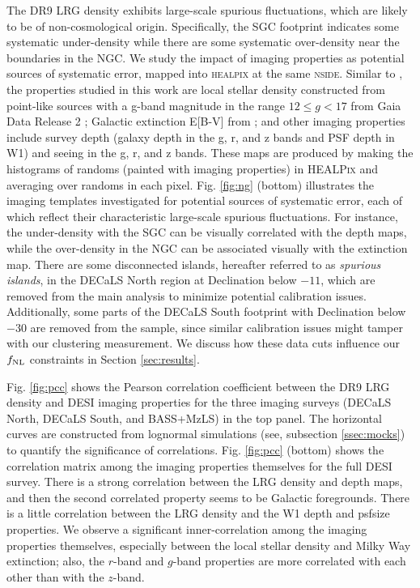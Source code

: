 The DR9 LRG density exhibits large-scale spurious fluctuations, which are likely to be of non-cosmological origin. Specifically, the SGC footprint indicates some systematic under-density while there are some systematic over-density near the boundaries in the NGC. We study the impact of imaging properties as potential sources of systematic error, mapped into \textsc{healpix} at the same \textsc{nside}. Similar to \cite{zhou2022target}, the properties studied in this work are local stellar density constructed from point-like sources with a g-band magnitude in the range $12 \leq g < 17$ from Gaia Data Release 2 \citep[see,][]{gaiadr2, myers2022};  Galactic extinction E[B-V] from \cite{schlegel1998maps}; and other imaging properties include survey depth (galaxy depth in the g, r, and z bands and PSF depth in W1) and seeing in the g, r, and z bands. These maps are produced by making the histograms of randoms (painted with imaging properties) in \textsc{HEALPix} and averaging over randoms in each pixel. Fig. \ref{fig:ng} (bottom) illustrates the imaging templates investigated for potential sources of systematic error, each of which reflect their characteristic large-scale spurious fluctuations. For instance, the under-density with the SGC can be visually correlated with the depth maps, while the over-density in the NGC can be associated visually with the extinction map. There are some disconnected islands, hereafter referred to as \textit{spurious islands}, in the DECaLS North region at Declination below $-11$, which are removed from the main analysis to minimize potential calibration issues. Additionally, some parts of the DECaLS South footprint with Declination below $-30$ are removed from the sample, since similar calibration issues might tamper with our clustering measurement. We discuss how these data cuts influence our $f_{\rm NL}$ constraints in Section \ref{sec:results}. 

Fig. \ref{fig:pcc} shows the Pearson correlation coefficient between the DR9 LRG density and DESI imaging properties for the three imaging surveys (DECaLS North, DECaLS South, and BASS+MzLS) in the top panel. The horizontal curves are constructed from lognormal simulations (see, subsection \ref{ssec:mocks}) to quantify the significance of correlations. Fig. \ref{fig:pcc} (bottom) shows the correlation matrix among the imaging properties themselves for the full DESI survey. There is a strong correlation between the LRG density and depth maps, and then the second correlated property seems to be Galactic foregrounds. There is a little correlation between the LRG density and the W1 depth and psfsize properties. We observe a significant inner-correlation among the imaging properties themselves, especially between the local stellar density and Milky Way extinction; also, the $r$-band and $g$-band properties are more correlated with each other than with the $z$-band. 

